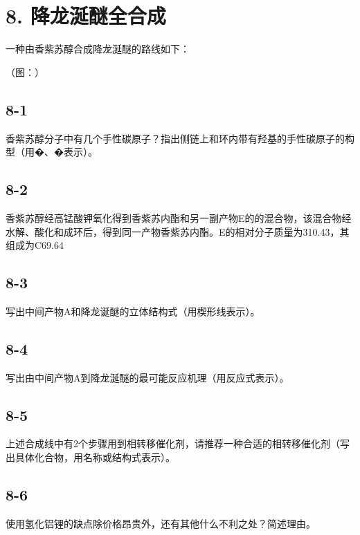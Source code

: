 \section*{8. 降龙涎醚全合成}
⼀种由⾹紫苏醇合成降⻰涎醚的路线如下：

（图：）

\subsection*{8-1}
⾹紫苏醇分⼦中有⼏个⼿性碳原⼦？指出侧链上和环内带有羟基的⼿性碳原⼦的构型（⽤�、�表⽰）。

\subsection*{8-2}
⾹紫苏醇经⾼锰酸钾氧化得到⾹紫苏内酯和另⼀副产物E的的混合物，该混合物经⽔解、酸化和成环后，得到同⼀产物⾹紫苏内酯。E的相对分⼦质量为310.43，其组成为C69.64%

\subsection*{8-3}
写出中间产物A和降⻰诞醚的⽴体结构式（⽤楔形线表⽰）。

\subsection*{8-4}
写出由中间产物A到降⻰涎醚的最可能反应机理（⽤反应式表⽰）。

\subsection*{8-5}
上述合成线中有2个步骤⽤到相转移催化剂，请推荐⼀种合适的相转移催化剂（写出具体化合物，⽤名称或结构式表⽰）。

\subsection*{8-6}
使⽤氢化铝锂的缺点除价格昂贵外，还有其他什么不利之处？简述理由。
